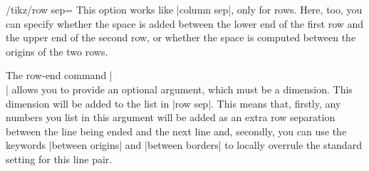 \begin{key}{/tikz/row sep=}
  This option works like |column sep|, only for rows. Here, too, you
  can specify whether the space is added between the lower end of the
  first row and the upper end of the second row, or whether the space
  is computed between the origins of the two rows.
\begin{codeexample}[]
\end{codeexample}
\begin{codeexample}[]
\end{codeexample}
\end{key}

The row-end command |\\| allows you to provide an optional
argument, which must be a dimension. This dimension will be added to
the list in |row sep|. This means that, firstly, any numbers you list
in this argument will be added as an extra row separation between the
line being ended and the next line and, secondly, you can use the
keywords |between origins| and |between borders| to locally overrule
the standard setting for this line pair.
\begin{codeexample}[]
\end{codeexample}


